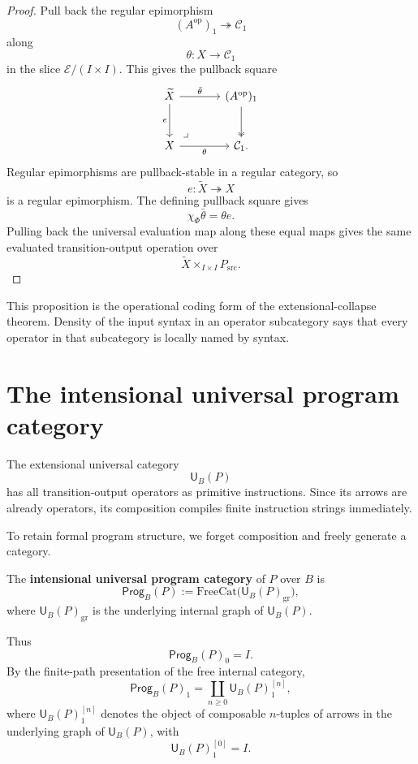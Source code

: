 \begin{proof}
Pull back the regular epimorphism
\[
        (A^{\operatorname{op}})_1\twoheadrightarrow \mathcal C_1
\]
along
\[
        \theta:X\to\mathcal C_1
\]
in the slice \(\mathcal E/(I\times I)\).  This gives the pullback square
\[
\begin{tikzcd}[column sep=large,row sep=large]
\widetilde X
\ar[r,"\bar\theta"]
\ar[d,swap,"e"]
&
(A^{\operatorname{op}})_1
\ar[d,two heads]
\\
X
\ar[r,swap,"\theta"]
\ar[ur,phantom,very near start,"\lrcorner"]
&
\mathcal C_1 .
\end{tikzcd}
\]
Regular epimorphisms are pullback-stable in a regular category, so
\[
        e:\widetilde X\twoheadrightarrow X
\]
is a regular epimorphism.  The defining pullback square gives
\[
        \chi_\Phi\bar\theta=\theta e.
\]
Pulling back the universal evaluation map along these equal maps gives the same evaluated
transition-output operation over
\[
        \widetilde X\times_{I\times I}P_{\mathrm{src}}.
\]
\end{proof}

This proposition is the operational coding form of the extensional-collapse theorem.  Density of
the input syntax in an operator subcategory says that every operator in that subcategory is locally
named by syntax.

\section{The intensional universal program category}
\label{sec:intensional-universal-program-category}

The extensional universal category
\[
        \mathsf U_B(P)
\]
has all transition-output operators as primitive instructions.  Since its arrows are already
operators, its composition compiles finite instruction strings immediately.

To retain formal program structure, we forget composition and freely generate a category.

\begin{definition}
The \textbf{intensional universal program category} of \(P\) over \(B\) is
\[
        \mathsf{Prog}_B(P)
        :=
        \mathrm{FreeCat}\bigl(\mathsf U_B(P)_{\mathrm{gr}}\bigr),
\]
where \(\mathsf U_B(P)_{\mathrm{gr}}\) is the underlying internal graph of
\(\mathsf U_B(P)\).
\end{definition}

Thus
\[
        \mathsf{Prog}_B(P)_0=I.
\]
By the finite-path presentation of the free internal category,
\[
        \mathsf{Prog}_B(P)_1
        =
        \coprod_{n\geq 0}\mathsf U_B(P)_1^{[n]},
\]
where \(\mathsf U_B(P)_1^{[n]}\) denotes the object of composable \(n\)-tuples of arrows in the
underlying graph of \(\mathsf U_B(P)\), with
\[
        \mathsf U_B(P)_1^{[0]}=I.
\]

